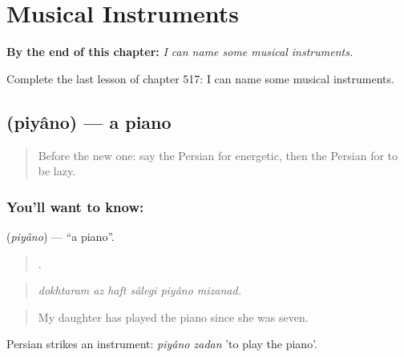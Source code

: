 
\chapter{Musical Instruments}
\label{ch:fa-musical-instruments}

\begin{chapteropening}
\textbf{By the end of this chapter:} \emph{I can name some musical instruments.}

Complete the last lesson of chapter 517: I can name some musical instruments.
\end{chapteropening}

\section[\texorpdfstring{\fa{پیانو} (piyâno)}{پیانو (piyâno)}]{ (piyâno) — a piano}

\label{lesson:FA-C517-piyano}



\begin{quote}
Before the new one: say the Persian for energetic, then the Persian for to be lazy.
\end{quote}

\subsection*{You'll want to know: }
\textbf{} (\emph{piyâno}) — \textquotedblleft{}a piano\textquotedblright{}.

\begin{quote}
     .
\end{quote}

\begin{quote}
\emph{dokhtaram az haft sâlegi piyâno mizanad.}
\end{quote}

\begin{quote}
My daughter has played the piano since she was seven.
\end{quote}

Persian strikes an instrument: \emph{piyâno zadan} 'to play the piano'.

